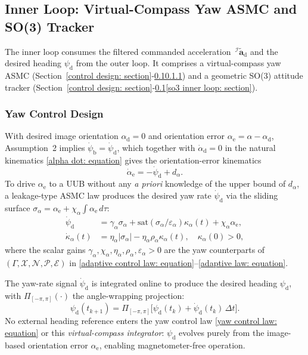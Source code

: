 \documentclass{IEEEtaes}
\begin{document}
\subsection{Inner Loop: Virtual-Compass Yaw ASMC and SO(3) Tracker} \label{inner loop: section}
The inner loop consumes the filtered commanded acceleration $\,^\mathcal{I}\tilde{\boldsymbol{a}}_\text{d}$ and the desired heading $\psi_\text{d}$ from the outer loop. It comprises a virtual-compass yaw ASMC (Section~\ref{control design: section}-\ref{inner loop: section}\ref{yaw control: section}) and a geometric SO(3) attitude tracker (Section~\ref{control design: section}-\ref{inner loop: section}\ref{so3 inner loop: section}).

\subsubsection{Yaw Control Design} \label{yaw control: section}
With desired image orientation $\alpha_\text{d}=0$ and orientation error $\alpha_\text{e}=\alpha-\alpha_\text{d}$, Assumption~2 implies $\dot{\psi}_\text{b}=\dot{\psi}_\text{d}$, which together with $\dot{\alpha}_\text{d}=0$ in the natural kinematics \eqref{alpha dot: equation} gives the orientation-error kinematics
\begin{equation} \label{alpha_e_dot: equation}
    \dot{\alpha}_\text{e} = -\dot{\psi}_\text{d} + d_{\alpha}.
\end{equation}
To drive $\alpha_\text{e}$ to a UUB without any \emph{a priori} knowledge of the upper bound of $d_{\alpha}$, a leakage-type ASMC law produces the desired yaw rate $\dot{\psi}_\text{d}$ via the sliding surface $\sigma_{\alpha}=\alpha_\text{e}+\chi_{\alpha}\!\int\alpha_\text{e}\,d\tau$:
\begin{align} \label{yaw control law: equation}
    \dot{\psi}_\text{d} &= \gamma_{\alpha}\sigma_{\alpha} + \text{sat}(\sigma_{\alpha}/\varepsilon_{\alpha})\kappa_{\alpha}(t) + \chi_{\alpha} \alpha_\text{e}, \nonumber\\
    \dot{\kappa}_{\alpha}(t) &= \eta_{\alpha}|\sigma_{\alpha}| - \eta_{\alpha}\rho_{\alpha}\kappa_{\alpha}(t),\quad\kappa_{\alpha}(0)>0,
\end{align}
where the scalar gains $\gamma_{\alpha}, \chi_{\alpha}, \eta_{\alpha}, \rho_{\alpha}, \varepsilon_{\alpha} > 0$ are the yaw counterparts of $(\Gamma,\mathcal{X},\mathcal{N},\mathcal{P},\mathcal{E})$ in \eqref{adaptive control law: equation}--\eqref{adaptive law: equation}.

The yaw-rate signal $\dot{\psi}_\text{d}$ is integrated online to produce the desired heading $\psi_\text{d}$, with $\Pi_{[-\pi,\pi]}(\cdot)$ the angle-wrapping projection:
\begin{equation} \label{psi d integrator: equation}
    \psi_\text{d}(t_{k+1}) = \Pi_{[-\pi,\pi]}\!\big[\psi_\text{d}(t_k) + \dot{\psi}_\text{d}(t_k)\,\Delta t\big].
\end{equation}
No external heading reference enters the yaw control law \eqref{yaw control law: equation} or this \emph{virtual-compass integrator}: $\psi_\text{d}$ evolves purely from the image-based orientation error $\alpha_\text{e}$, enabling magnetometer-free operation.
\end{document}
